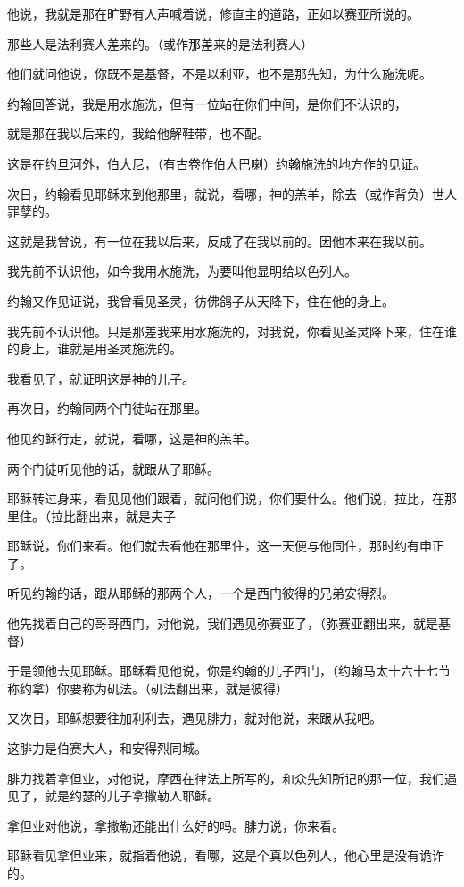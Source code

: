 \documentclass[12pt,oneside]{book}
\begin{document}
他说，我就是那在旷野有人声喊着说，修直主的道路，正如以赛亚所说的。

那些人是法利赛人差来的。（或作那差来的是法利赛人）

他们就问他说，你既不是基督，不是以利亚，也不是那先知，为什么施洗呢。

约翰回答说，我是用水施洗，但有一位站在你们中间，是你们不认识的，

就是那在我以后来的，我给他解鞋带，也不配。

这是在约旦河外，伯大尼，（有古卷作伯大巴喇）约翰施洗的地方作的见证。

次日，约翰看见耶稣来到他那里，就说，看哪，神的羔羊，除去（或作背负）世人罪孽的。

这就是我曾说，有一位在我以后来，反成了在我以前的。因他本来在我以前。

我先前不认识他，如今我用水施洗，为要叫他显明给以色列人。

约翰又作见证说，我曾看见圣灵，彷佛鸽子从天降下，住在他的身上。

我先前不认识他。只是那差我来用水施洗的，对我说，你看见圣灵降下来，住在谁的身上，谁就是用圣灵施洗的。

我看见了，就证明这是神的儿子。

再次日，约翰同两个门徒站在那里。

他见约稣行走，就说，看哪，这是神的羔羊。

两个门徒听见他的话，就跟从了耶稣。

耶稣转过身来，看见见他们跟着，就问他们说，你们要什么。他们说，拉比，在那里住。（拉比翻出来，就是夫子

耶稣说，你们来看。他们就去看他在那里住，这一天便与他同住，那时约有申正了。

听见约翰的话，跟从耶稣的那两个人，一个是西门彼得的兄弟安得烈。

他先找着自己的哥哥西门，对他说，我们遇见弥赛亚了，（弥赛亚翻出来，就是基督）

于是领他去见耶稣。耶稣看见他说，你是约翰的儿子西门，（约翰马太十六十七节称约拿）你要称为矶法。（矶法翻出来，就是彼得）

又次日，耶稣想要往加利利去，遇见腓力，就对他说，来跟从我吧。

这腓力是伯赛大人，和安得烈同城。

腓力找着拿但业，对他说，摩西在律法上所写的，和众先知所记的那一位，我们遇见了，就是约瑟的儿子拿撒勒人耶稣。

拿但业对他说，拿撒勒还能出什么好的吗。腓力说，你来看。

耶稣看见拿但业来，就指着他说，看哪，这是个真以色列人，他心里是没有诡诈的。
\end{document}
